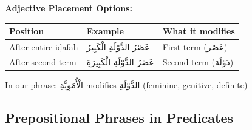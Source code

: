 \documentclass[letterpaper,12pt]{article}
\begin{document}
\begin{tcolorbox}[colback=white,colframe=accentcolor,breakable]
\vspace{0.5em}
\textbf{Adjective Placement Options:}

\begin{tabular}{|l|p{6cm}|l|}
\hline
\textbf{Position} & \textbf{Example} & \textbf{What it modifies} \\
\hline
After entire iḍāfah & \textarabic{عَصْرُ الدَّوْلَةِ الْكَبِيرُ} & First term (\textarabic{عَصْر}) \\
\hline
After second term & \textarabic{عَصْرُ الدَّوْلَةِ الْكَبِيرَةِ} & Second term (\textarabic{دَوْلَة}) \\
\hline
\end{tabular}

In our phrase: \textarabic{الْأُمَوِيَّةِ} modifies \textarabic{الدَّوْلَةِ} (feminine, genitive, definite)
\end{tcolorbox}

\subsection{Prepositional Phrases in Predicates}
\end{document}
